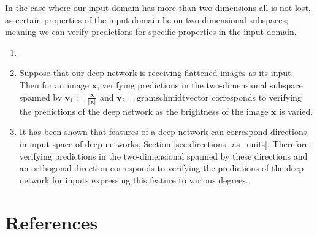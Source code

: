 In the case where our input domain has more than two-dimensions all is not lost, as certain properties of the input domain lie on two-dimensional subspaces; meaning we can verify predictions for specific properties in the input domain.

\begin{example}
    \begin{enumerate}
        \item[]
        \item Suppose that our deep network is receiving flattened images as its input. Then for an image $\mathbf{x}$, verifying predictions in the two-dimensional subspace spanned by $\mathbf{v}_1:=\frac{\mathbf{x}}{\Vert\mathbf{x}\Vert}$ and $\mathbf{v}_2=\text{gramschmidtvector}$ corresponds to verifying the predictions of the deep network as the brightness of the image $\mathbf{x}$ is varied.
        \item It has been shown that features of a deep network can correspond directions in input space of deep networks, Section \ref{sec:directions_as_units}. Therefore, verifying predictions in the two-dimensional spanned by these directions and an orthogonal direction corresponds to verifying the predictions of the deep network for inputs expressing this feature to various degrees.
    \end{enumerate}
\end{example}

\section{References}
